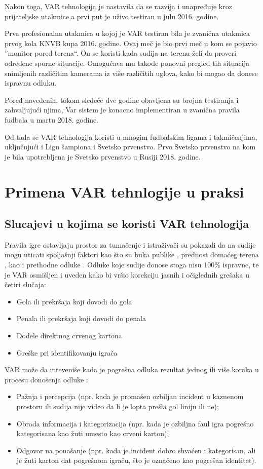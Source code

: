 \documentclass[a4paper]{article}
\begin{document}
Nakon toga, VAR tehnologija je nastavila da se razvija i unapređuje kroz prijateljske utakmice,a prvi put je uživo testiran u julu 2016. godine. 

Prva profesionalna utakmica u kojoj je VAR testiran bila je zvanična utakmica prvog kola KNVB kupa 2016. godine. Ovaj meč je bio prvi meč u kom se pojavio ”monitor pored terena“. On se koristi kada sudija na terenu želi da proveri određene sporne situacije. Omogućava mu takođe ponovni pregled tih situacija snimljenih različitim kamerama iz više različitih uglova, kako bi mogao da donese ispravnu odluku.

Pored navedenih, tokom sledeće dve godine obavljena su brojna testiranja i zahvaljujući njima, Var sistem je konacno implementiran u zvanična pravila fudbala u martu 2018. godine.

Od tada se VAR tehnologija koristi u mnogim fudbalskim ligama i takmičenjima, uključujući i Ligu šampiona i Svetsko prvenstvo. Prvo Svetsko prvenstvo na kom je bila upotrebljena je Svetsko prvenstvo u Rusiji 2018. godine. \cite{prvenstvo}

\section{Primena VAR tehnlogije u praksi}
\subsection{Slucajevi u kojima se koristi VAR tehnologija}
Pravila igre ostavljaju prostor za tumačenje i istraživači su pokazali da na sudije mogu uticati spoljašnji faktori kao što su buka publike \cite{Nevill}, prednost domaćeg terena \cite{Memmert}, kao i prethodne odluke \cite{Plessner}. Odluke koje sudije donose stoga nisu 100\% ispravne, te je VAR osmišljen i uveden kako bi vršio korekciju jasnih i očiglednih grešaka u četiri slučaja:
\begin{itemize}
\item Gola ili prekršaja koji dovodi do gola
\item Penala ili prekršaja koji dovodi do penala
\item Dodele direktnog crvenog kartona
\item Greške pri identifikovanju igrača
\end{itemize}

VAR može da inteveniše kada je pogrešna odluka rezultat jednog ili više koraka u procesu donošenja odluke \cite{Plessner}:
\begin{itemize}
\item Pažnja i percepcija (npr. kada je promašen ozbiljan incident u kaznenom prostoru ili sudija nije video da li je lopta prešla gol liniju ili ne);
\item Obrada informacija i kategorizacija (npr. kada je ozbiljna faul igra pogrešno kategorisana kao žuti umesto kao crveni karton);
\item Odgovor na ponašanje (npr. kada je incident dobro shvaćen i kategorisan, ali je žuti karton dat pogrešnom igraču, što je označeno kao pogrešan identitet).
\end{itemize}
\end{document}
